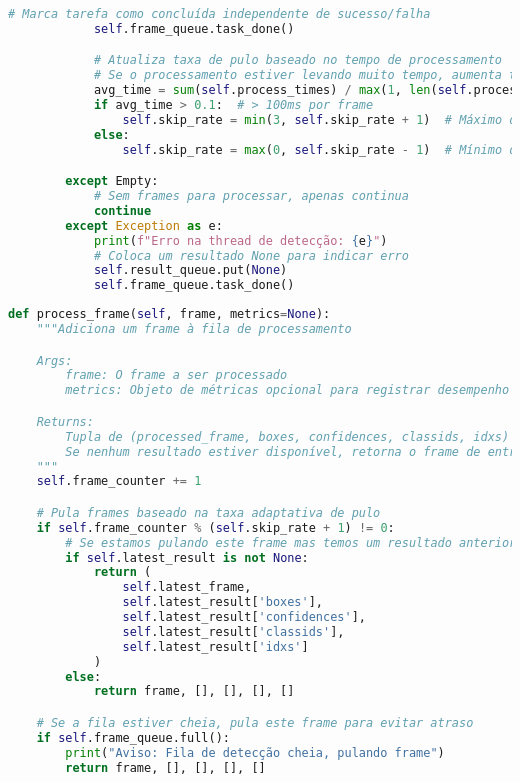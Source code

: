 \documentclass[
	12pt,				%
	oneside, %
	a4paper,			%
	english,			%
	french,				%
	spanish,			%
	brazil				%
	]{abntex2}
\begin{document}
\begin{apendicesenv}
\begin{lstlisting}[language=Python, caption=Método de processamento assíncrono de \textit{frames}., label=lst:process_frames]
            # Marca tarefa como concluída independente de sucesso/falha
            self.frame_queue.task_done()

            # Atualiza taxa de pulo baseado no tempo de processamento
            # Se o processamento estiver levando muito tempo, aumenta taxa de pulo
            avg_time = sum(self.process_times) / max(1, len(self.process_times))
            if avg_time > 0.1:  # > 100ms por frame
                self.skip_rate = min(3, self.skip_rate + 1)  # Máximo de pulo de 3 frames
            else:
                self.skip_rate = max(0, self.skip_rate - 1)  # Mínimo de pulo de 0 frames

        except Empty:
            # Sem frames para processar, apenas continua
            continue
        except Exception as e:
            print(f"Erro na thread de detecção: {e}")
            # Coloca um resultado None para indicar erro
            self.result_queue.put(None)
            self.frame_queue.task_done()
\end{lstlisting}

\begin{lstlisting}[language=Python, caption=Controle adaptativo de taxa de processamento., label=lst:adaptive_rate_control]
def process_frame(self, frame, metrics=None):
    """Adiciona um frame à fila de processamento

    Args:
        frame: O frame a ser processado
        metrics: Objeto de métricas opcional para registrar desempenho

    Returns:
        Tupla de (processed_frame, boxes, confidences, classids, idxs)
        Se nenhum resultado estiver disponível, retorna o frame de entrada e listas vazias
    """
    self.frame_counter += 1

    # Pula frames baseado na taxa adaptativa de pulo
    if self.frame_counter % (self.skip_rate + 1) != 0:
        # Se estamos pulando este frame mas temos um resultado anterior, retorna-o
        if self.latest_result is not None:
            return (
                self.latest_frame,
                self.latest_result['boxes'],
                self.latest_result['confidences'],
                self.latest_result['classids'],
                self.latest_result['idxs']
            )
        else:
            return frame, [], [], [], []

    # Se a fila estiver cheia, pula este frame para evitar atraso
    if self.frame_queue.full():
        print("Aviso: Fila de detecção cheia, pulando frame")
        return frame, [], [], [], []


\end{lstlisting}
\end{apendicesenv}
\end{document}
